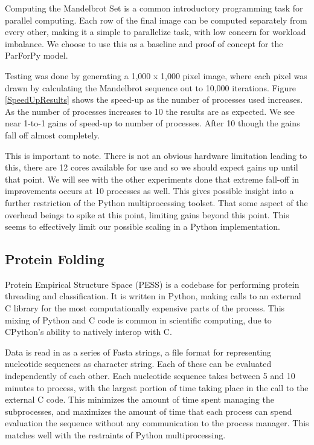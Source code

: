 \documentclass[conference]{IEEEtran}
\begin{document}
Computing the Mandelbrot Set is a common introductory programming task for parallel
computing.
Each row of the final image can be computed separately from every other,
making it a simple to parallelize task, with low concern for workload imbalance.
We choose to use this as a baseline and proof of concept for the ParForPy model.

Testing was done by generating a 1,000 x 1,000 pixel image, where each pixel was drawn by
calculating the Mandelbrot sequence out to 10,000 iterations.
Figure \ref{SpeedUpResults} shows the speed-up as the number of processes used increases.
As the number of processes increases to 10 the results are as expected. 
We see near 1-to-1 gains of speed-up to number of processes.
After 10 though the gains fall off almost completely.

This is important to note. 
There is not an obvious hardware limitation leading to this, there are 12 cores available for use and so we should expect gains up until that point. 
We will see with the other experiments done that extreme fall-off in improvements occurs 
at 10 processes as well.
This gives possible insight into a further restriction of the Python multiprocessing toolset. 
That some aspect of the overhead beings to spike at this point, limiting gains beyond this point.
This seems to effectively limit our possible scaling in a Python implementation.

\subsection{Protein Folding}

Protein Empirical Structure Space (PESS) is a codebase for performing protein
threading and classification\cite{middleton2016complete}. 
It is written in Python, making calls to an external C library for the
most computationally expensive parts of the process.
This mixing of Python and C code is common in scientific computing, due to CPython's 
ability to natively interop with C\cite{pythonCInterop}.

Data is read in as a series of Fasta strings, a file format for representing 
nucleotide sequences as character string.
Each of these can be evaluated independently of each other.
Each nucleotide sequence takes between 5 and 10 minutes to process, with
the largest portion of time taking place in the call to the external C code.
This minimizes the amount of time spent managing the subprocesses, and maximizes
the amount of time that each process can spend evaluation the sequence without 
any communication to the process manager.
This matches well with the restraints of Python multiprocessing.
\end{document}
